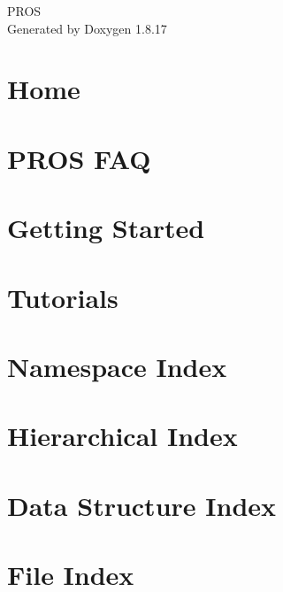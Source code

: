 \let\mypdfximage\pdfximage\def\pdfximage{\immediate\mypdfximage}\documentclass[twoside]{book}
\newcommand{\+}{\discretionary{\mbox{\scriptsize$\hookleftarrow$}}{}{}}
\newcommand{\clearemptydoublepage}{%
  \newpage{\pagestyle{empty}\cleardoublepage}%
}
\begin{document}
\hypersetup{pageanchor=false,
             bookmarksnumbered=true,
             pdfencoding=unicode
            }
\begin{titlepage}
\vspace*{7cm}
\begin{center}%
{\Large P\+R\+OS }\\
\vspace*{1cm}
{\large Generated by Doxygen 1.8.17}\\
\end{center}
\end{titlepage}
\clearemptydoublepage
{}
\tableofcontents
\clearemptydoublepage
{}
\hypersetup{pageanchor=true}

\chapter{Home}
\label{index}\hypertarget{index}{}
\chapter{P\+R\+OS F\+AQ}
\label{md_docs_getting-started_faq}

\chapter{Getting Started}
\label{getting-started}

\chapter{Tutorials}
\label{tutorials}

\chapter{Namespace Index}

\chapter{Hierarchical Index}

\chapter{Data Structure Index}

\chapter{File Index}

\end{document}
